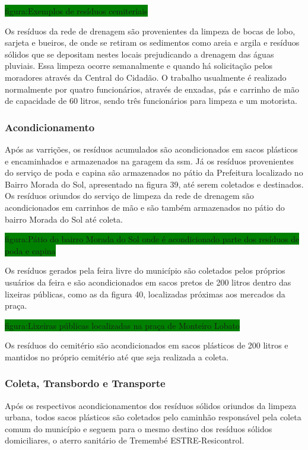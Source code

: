 	\colorbox{green}{figura:Exemplos de resíduos cemiteriais}
	
	Os resíduos da rede de drenagem são provenientes da limpeza de bocas de lobo, sarjeta e bueiros, de onde se retiram os sedimentos como areia e argila e resíduos sólidos que se depositam nestes locais prejudicando a drenagem das águas pluviais. Essa limpeza ocorre semanalmente e quando há solicitação pelos moradores através da Central do Cidadão. O trabalho usualmente é realizado normalmente por quatro funcionários, através de enxadas, pás e carrinho de mão de capacidade de 60 litros, sendo três funcionários para limpeza e um motorista.
	
	\subsubsection{Acondicionamento}
	
	Após as varrições, os resíduos acumulados são acondicionados em sacos plásticos e encaminhados e armazenados na garagem da \gls{ssm}.  Já os resíduos provenientes do serviço de poda e capina são armazenados no pátio da Prefeitura localizado no Bairro Morada do Sol, apresentado na figura 39, até serem coletados e destinados. Os resíduos oriundos do serviço de limpeza da rede de drenagem são acondicionados em carrinhos de mão e são também armazenados no pátio do bairro Morada do Sol até coleta.
	
	\colorbox{green}{figura:Pátio do bairro Morada do Sol onde é acondicionado parte dos resíduos de poda e capina}
	
	Os resíduos gerados pela feira livre do município são coletados pelos próprios usuários da feira e são acondicionados em sacos pretos de 200 litros dentro das lixeiras públicas, como as da figura 40, localizadas próximas aos mercados da praça.
	
	\colorbox{green}{figura:Lixeiras públicas localizadas na praça de Monteiro Lobato}
	
	Os resíduos do cemitério são acondicionados em sacos plásticos de 200 litros e mantidos no próprio cemitério até que seja realizada a coleta.
	
	\subsubsection{Coleta, Transbordo e Transporte}
	
	Após os respectivos acondicionamentos dos resíduos sólidos oriundos da limpeza urbana, todos sacos plásticos são coletados pelo caminhão responsável pela coleta comum do município e seguem para o mesmo destino dos resíduos sólidos domiciliares, o aterro sanitário de Tremembé ESTRE-Resicontrol.
	
